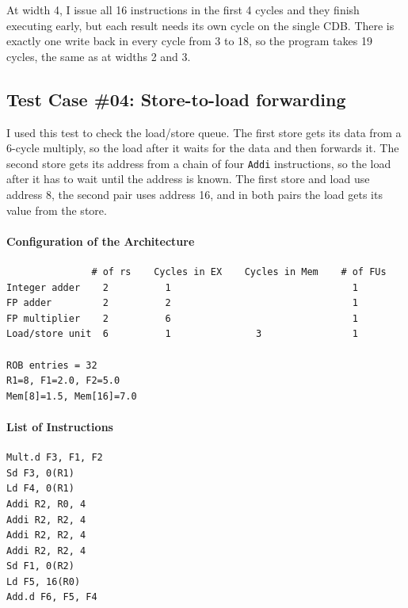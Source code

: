 \documentclass[11pt]{article}
\renewcommand{\_}{\origunderscore\allowbreak}
\begin{document}
At width 4, I issue all 16 instructions in the first 4 cycles and they finish executing early,
but each result needs its own cycle on the single CDB. There is exactly one write back in every
cycle from 3 to 18, so the program takes 19 cycles, the same as at widths
2 and 3.

\subsection{Test Case \#04: Store-to-load forwarding}

I used this test to check the load/store queue. The first store gets its data from a 6-cycle
multiply, so the load after it waits for the data and then forwards it. The second store gets its
address from a chain of four \texttt{Addi} instructions, so the load after it has to wait until
the address is known. The first store and load use address 8, the second pair uses address 16,
and in both pairs the load gets its value from the store.

\paragraph{Configuration of the Architecture}
\begin{verbatim}
               # of rs    Cycles in EX    Cycles in Mem    # of FUs
Integer adder    2          1                                1
FP adder         2          2                                1
FP multiplier    2          6                                1
Load/store unit  6          1               3                1

ROB entries = 32
R1=8, F1=2.0, F2=5.0
Mem[8]=1.5, Mem[16]=7.0
\end{verbatim}

\paragraph{List of Instructions}
\begin{verbatim}
Mult.d F3, F1, F2
Sd F3, 0(R1)
Ld F4, 0(R1)
Addi R2, R0, 4
Addi R2, R2, 4
Addi R2, R2, 4
Addi R2, R2, 4
Sd F1, 0(R2)
Ld F5, 16(R0)
Add.d F6, F5, F4
\end{verbatim}
\end{document}
